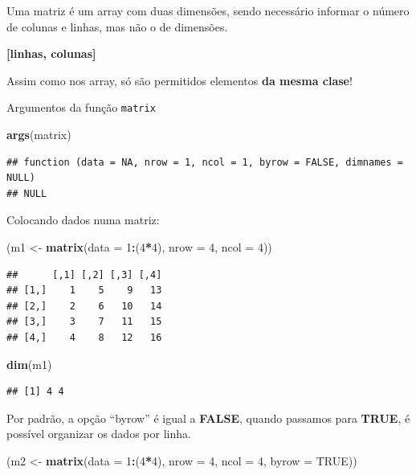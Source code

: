 \documentclass[]{book}
\newenvironment{Shaded}{\begin{snugshade}}{\end{snugshade}}
\newcommand{\KeywordTok}[1]{\textcolor[rgb]{0.13,0.29,0.53}{\textbf{#1}}}
\newcommand{\DataTypeTok}[1]{\textcolor[rgb]{0.13,0.29,0.53}{#1}}
\newcommand{\DecValTok}[1]{\textcolor[rgb]{0.00,0.00,0.81}{#1}}
\newcommand{\StringTok}[1]{\textcolor[rgb]{0.31,0.60,0.02}{#1}}
\newcommand{\OtherTok}[1]{\textcolor[rgb]{0.56,0.35,0.01}{#1}}
\newcommand{\OperatorTok}[1]{\textcolor[rgb]{0.81,0.36,0.00}{\textbf{#1}}}
\newcommand{\NormalTok}[1]{#1}
\theoremstyle{definition}
\theoremstyle{definition}
\theoremstyle{definition}
\theoremstyle{remark}
\begin{document}
Uma matriz é um array com duas dimensões, sendo necessário informar o
número de colunas e linhas, mas não o de dimensões.

\textbf{{[}linhas, colunas{]}}

Assim como nos array, só são permitidos elementos \textbf{da mesma
clase}!

Argumentos da função \texttt{matrix}

\begin{Shaded}
\begin{Highlighting}[]
\KeywordTok{args}\NormalTok{(matrix)}
\end{Highlighting}
\end{Shaded}

\begin{verbatim}
## function (data = NA, nrow = 1, ncol = 1, byrow = FALSE, dimnames = NULL) 
## NULL
\end{verbatim}

Colocando dados numa matriz:

\begin{Shaded}
\begin{Highlighting}[]
\NormalTok{(m1 <-}\StringTok{ }\KeywordTok{matrix}\NormalTok{(}\DataTypeTok{data =} \DecValTok{1}\OperatorTok{:}\NormalTok{(}\DecValTok{4}\OperatorTok{*}\DecValTok{4}\NormalTok{), }\DataTypeTok{nrow =} \DecValTok{4}\NormalTok{, }\DataTypeTok{ncol =} \DecValTok{4}\NormalTok{))}
\end{Highlighting}
\end{Shaded}

\begin{verbatim}
##      [,1] [,2] [,3] [,4]
## [1,]    1    5    9   13
## [2,]    2    6   10   14
## [3,]    3    7   11   15
## [4,]    4    8   12   16
\end{verbatim}

\begin{Shaded}
\begin{Highlighting}[]
\KeywordTok{dim}\NormalTok{(m1)}
\end{Highlighting}
\end{Shaded}

\begin{verbatim}
## [1] 4 4
\end{verbatim}

Por padrão, a opção ``byrow'' é igual a \textbf{FALSE}, quando passamos
para \textbf{TRUE}, é possível organizar os dados por linha.

\begin{Shaded}
\begin{Highlighting}[]
\NormalTok{(m2 <-}\StringTok{ }\KeywordTok{matrix}\NormalTok{(}\DataTypeTok{data =} \DecValTok{1}\OperatorTok{:}\NormalTok{(}\DecValTok{4}\OperatorTok{*}\DecValTok{4}\NormalTok{), }\DataTypeTok{nrow =} \DecValTok{4}\NormalTok{, }\DataTypeTok{ncol =} \DecValTok{4}\NormalTok{, }\DataTypeTok{byrow =} \OtherTok{TRUE}\NormalTok{))}
\end{Highlighting}
\end{Shaded}
\end{document}
